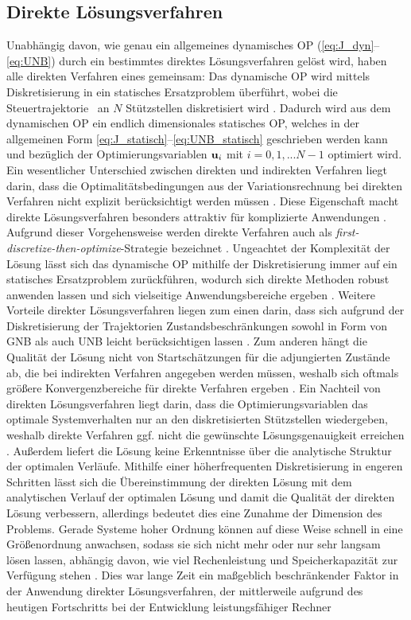 \subsection{Direkte Lösungsverfahren}\label{subsec:Direkt}
Unabhängig davon, wie genau ein allgemeines dynamisches \gls{OP} (\eqref{eq:J_dyn}--\eqref{eq:UNB}) durch ein bestimmtes direktes Lösungsverfahren gelöst wird, haben alle direkten Verfahren eines gemeinsam: Das dynamische \gls{OP} wird mittels Diskretisierung in ein statisches Ersatzproblem überführt, wobei die Steuertrajektorie \uoft~an $N$ Stützstellen diskretisiert wird \cite{KnutGraichen.2012}. Dadurch wird aus dem dynamischen \gls{OP} ein endlich dimensionales statisches \gls{OP}, welches in der allgemeinen Form \eqref{eq:J_statisch}--\eqref{eq:UNB_statisch} geschrieben werden kann und bezüglich der Optimierungsvariablen $\boldsymbol{\mathrm{u}}_i$ mit $i=0,1,...N-1$ optimiert wird. Ein wesentlicher Unterschied zwischen direkten und indirekten Verfahren liegt darin, dass die Optimalitätsbedingungen aus der Variationsrechnung bei direkten Verfahren nicht explizit berücksichtigt werden müssen \cite{Rathgeber.2016}. Diese Eigenschaft macht direkte Lösungsverfahren besonders attraktiv für komplizierte Anwendungen \cite{Betts.1998}. Aufgrund dieser Vorgehensweise werden direkte Verfahren auch als \glqq\textit{first-discretize-then-optimize\grqq}-Strategie bezeichnet \cite{Papageorgiou.2012}. Ungeachtet der Komplexität der Lösung lässt sich das dynamische \gls{OP} mithilfe der Diskretisierung immer auf ein statisches Ersatzproblem zurückführen, wodurch sich direkte Methoden robust anwenden lassen und sich vielseitige Anwendungsbereiche ergeben \cite{Betts.1998}. Weitere Vorteile direkter Lösungsverfahren liegen zum einen darin, dass sich aufgrund der Diskretisierung der Trajektorien Zustandsbeschränkungen sowohl in Form von \gls{GNB} als auch \gls{UNB} leicht berücksichtigen lassen \cite{KnutGraichen.2012}. Zum anderen hängt die Qualität der Lösung nicht von Startschätzungen für die adjungierten Zustände ab, die bei indirekten Verfahren angegeben werden müssen, weshalb sich oftmals größere Konvergenzbereiche für direkte Verfahren ergeben \cite{KnutGraichen.2012}. Ein Nachteil von direkten Lösungsverfahren liegt darin, dass die Optimierungsvariablen das optimale Systemverhalten nur an den diskretisierten Stützstellen wiedergeben, weshalb direkte Verfahren ggf. nicht die gewünschte Lösungsgenauigkeit erreichen \cite{Papageorgiou.2012}. Außerdem liefert die Lösung keine Erkenntnisse über die analytische Struktur der optimalen Verläufe. Mithilfe einer höherfrequenten Diskretisierung in engeren Schritten lässt sich die Übereinstimmung der direkten Lösung mit dem analytischen Verlauf der optimalen Lösung und damit die Qualität der direkten Lösung verbessern, allerdings bedeutet dies eine Zunahme der Dimension des Problems. Gerade Systeme hoher Ordnung können auf diese Weise schnell in eine Größenordnung anwachsen, sodass sie sich nicht mehr oder nur sehr langsam lösen lassen, abhängig davon, wie viel Rechenleistung und Speicherkapazität zur Verfügung stehen \cite{Papageorgiou.2012}. Dies war lange Zeit ein maßgeblich beschränkender Faktor in der Anwendung direkter Lösungsverfahren, der mittlerweile aufgrund des heutigen Fortschritts bei der Entwicklung leistungsfähiger Rechner 